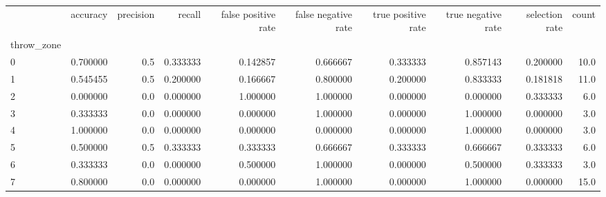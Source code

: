 \begin{tabular}{lrrrrrrrrr}
\toprule
{} &  accuracy &  precision &    recall &  false positive rate &  false negative rate &  true positive rate &  true negative rate &  selection rate &  count \\
throw\_zone &           &            &           &                      &                      &                     &                     &                 &        \\
\midrule
0          &  0.700000 &        0.5 &  0.333333 &             0.142857 &             0.666667 &            0.333333 &            0.857143 &        0.200000 &   10.0 \\
1          &  0.545455 &        0.5 &  0.200000 &             0.166667 &             0.800000 &            0.200000 &            0.833333 &        0.181818 &   11.0 \\
2          &  0.000000 &        0.0 &  0.000000 &             1.000000 &             1.000000 &            0.000000 &            0.000000 &        0.333333 &    6.0 \\
3          &  0.333333 &        0.0 &  0.000000 &             0.000000 &             1.000000 &            0.000000 &            1.000000 &        0.000000 &    3.0 \\
4          &  1.000000 &        0.0 &  0.000000 &             0.000000 &             0.000000 &            0.000000 &            1.000000 &        0.000000 &    3.0 \\
5          &  0.500000 &        0.5 &  0.333333 &             0.333333 &             0.666667 &            0.333333 &            0.666667 &        0.333333 &    6.0 \\
6          &  0.333333 &        0.0 &  0.000000 &             0.500000 &             1.000000 &            0.000000 &            0.500000 &        0.333333 &    3.0 \\
7          &  0.800000 &        0.0 &  0.000000 &             0.000000 &             1.000000 &            0.000000 &            1.000000 &        0.000000 &   15.0 \\
\bottomrule
\end{tabular}
